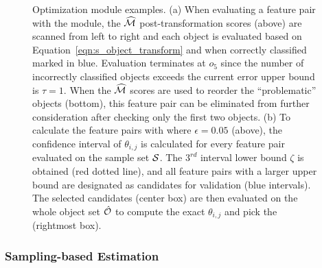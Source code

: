 \begin{figure}[t!]
 \centering
 \vspace{-2mm}
 \vspace{-5mm}
\caption{Optimization module examples. (a) When evaluating a feature pair with the \earlyT module, the $\widehat{{\mathcal{M}}}$ post-transformation scores (above) are scanned from left to right and each object is evaluated based on Equation~\ref{eqn:s_object_transform} and when correctly classified marked in blue. Evaluation terminates at $o_5$ since the number of incorrectly classified objects exceeds the current error upper bound is $\tau=1$. When the $\widehat{{\mathcal{M}}}$ scores are used to reorder the ``problematic'' objects (bottom), this feature pair can be eliminated from further consideration after checking only the first two objects. (b) To calculate the \topthree feature pairs with \sampling where $\epsilon = 0.05$ (above), the confidence interval of $\theta_{i,j}$ is calculated for every feature pair evaluated on the sample set ${\mathcal{S}}$. The $3^{rd}$ interval lower bound $\zeta$ is obtained (red dotted line), and all feature pairs with a larger upper bound are designated as candidates for validation (blue intervals). The selected candidates (center box) are then evaluated on the whole object set $\hat{{\mathcal{O}}}$ to compute the exact $\theta_{i,j}$ and pick the \topthree (rightmost box).}
\vspace{-5mm}
\label{fig:etermANDsampling}
\end{figure}

\subsubsection{Sampling-based Estimation} \label{ssec:sampling}

